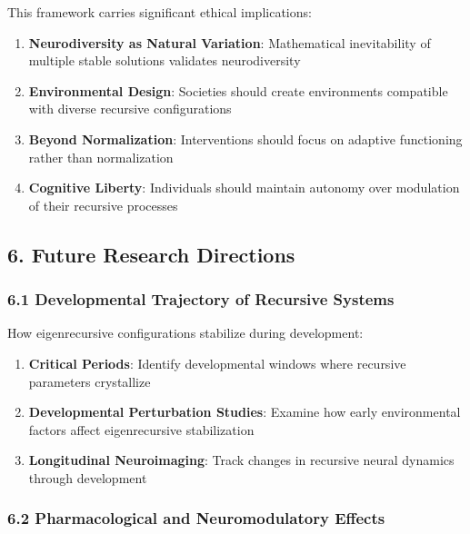 \documentclass[
]{article}
\providecommand{\tightlist}{%
  \setlength{\itemsep}{0pt}\setlength{\parskip}{0pt}}
\begin{document}
This framework carries significant ethical implications:

\begin{enumerate}
\def\labelenumi{\arabic{enumi}.}
\tightlist
\item
  \textbf{Neurodiversity as Natural Variation}: Mathematical
  inevitability of multiple stable solutions validates neurodiversity
\item
  \textbf{Environmental Design}: Societies should create environments
  compatible with diverse recursive configurations
\item
  \textbf{Beyond Normalization}: Interventions should focus on adaptive
  functioning rather than normalization
\item
  \textbf{Cognitive Liberty}: Individuals should maintain autonomy over
  modulation of their recursive processes
\end{enumerate}

\subsection{6. Future Research
Directions}\label{future-research-directions-5}

\subsubsection{6.1 Developmental Trajectory of Recursive
Systems}\label{developmental-trajectory-of-recursive-systems}

How eigenrecursive configurations stabilize during development:

\begin{enumerate}
\def\labelenumi{\arabic{enumi}.}
\tightlist
\item
  \textbf{Critical Periods}: Identify developmental windows where
  recursive parameters crystallize
\item
  \textbf{Developmental Perturbation Studies}: Examine how early
  environmental factors affect eigenrecursive stabilization
\item
  \textbf{Longitudinal Neuroimaging}: Track changes in recursive neural
  dynamics through development
\end{enumerate}

\subsubsection{6.2 Pharmacological and Neuromodulatory
Effects}\label{pharmacological-and-neuromodulatory-effects}
\end{document}
